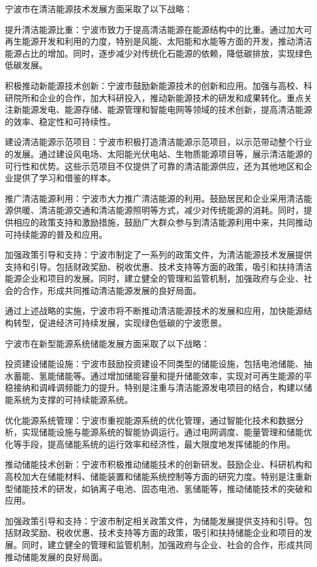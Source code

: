 宁波市在清洁能源技术发展方面采取了以下战略：

提升清洁能源比重：宁波市致力于提高清洁能源在能源结构中的比重。通过加大可再生能源开发和利用的力度，特别是风能、太阳能和水能等方面的开发，推动清洁能源占比的增加。同时，逐步减少对传统化石能源的依赖，降低碳排放，实现绿色低碳发展。

积极推动新能源技术创新：宁波市鼓励新能源技术的创新和应用。加强与高校、科研院所和企业的合作，加大科研投入，推动新能源技术的研发和成果转化。重点关注新能源发电、能源存储、能源管理和智能电网等领域的技术创新，提高清洁能源的效率、稳定性和可持续性。

建设清洁能源示范项目：宁波市积极打造清洁能源示范项目，以示范带动整个行业的发展。通过建设风电场、太阳能光伏电站、生物质能源项目等，展示清洁能源的可行性和优势。这些示范项目不仅提供了可靠的清洁能源供应，还为其他地区和企业提供了学习和借鉴的样本。

推广清洁能源利用：宁波市大力推广清洁能源的利用。鼓励居民和企业采用清洁能源供暖、清洁能源交通和清洁能源照明等方式，减少对传统能源的消耗。同时，提供相应的政策支持和激励措施，鼓励广大群众参与到清洁能源利用中来，共同推动可持续能源的普及和应用。

加强政策引导和支持：宁波市制定了一系列的政策文件，为清洁能源技术发展提供支持和引导。包括财政奖励、税收优惠、技术支持等方面的政策，吸引和扶持清洁能源企业和项目的发展。同时，建立健全的管理和监管机制，加强政府与企业、社会的合作，形成共同推动清洁能源发展的良好局面。

通过上述战略的实施，宁波市将不断推动清洁能源技术的发展和应用，加快能源结构转型，促进经济可持续发展，实现绿色低碳的宁波愿景。

宁波市在新型能源系统储能发展方面采取了以下战略：

投资建设储能设施：宁波市鼓励投资建设不同类型的储能设施，包括电池储能、抽水蓄能、氢能储能等。通过增加储能容量和提升储能效率，实现对可再生能源的平稳接纳和调峰调频能力的提升。特别是注重与清洁能源发电项目的结合，构建以储能系统为支撑的可持续能源系统。

优化能源系统管理：宁波市重视能源系统的优化管理，通过智能化技术和数据分析，实现储能设施与能源系统的智能协调运行。通过电网调度、能量管理和储能优化等手段，提高储能系统的运行效率和经济性，最大限度地发挥储能的作用。

推动储能技术创新：宁波市积极推动储能技术的创新研发。鼓励企业、科研机构和高校加大在储能材料、储能装置和储能系统控制等方面的研究力度。特别是注重新型储能技术的研发，如钠离子电池、固态电池、氢储能等，推动储能技术的突破和应用。

加强政策引导和支持：宁波市制定相关政策文件，为储能发展提供支持和引导。包括财政奖励、税收优惠、技术支持等方面的政策，吸引和扶持储能企业和项目的发展。同时，建立健全的管理和监管机制，加强政府与企业、社会的合作，形成共同推动储能发展的良好局面。

